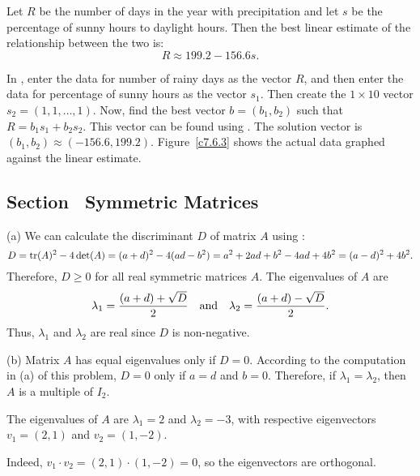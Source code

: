 \begin{figure}[htb]
		\centerline{%
		}
\end{figure}

\ans Let $R$ be the number of days in the year with precipitation and
let $s$ be the percentage of sunny hours to daylight hours.  Then the
best linear estimate of the relationship between the two is:
\[ R \approx 199.2 - 156.6s. \]

\soln In \Matlabp, enter the data for number of rainy days as the vector
$R$, and then enter the data for percentage of sunny hours as the vector
$s_1$.  Then create the $1 \times 10$ vector $s_2 = (1,1,\dots,1)$.  Now,
find the best vector $b = (b_1,b_2)$ such that $R = b_1s_1 + b_2s_2$. 
This vector can be found using .  The solution vector
is $(b_1,b_2) \approx (-156.6,199.2)$.  Figure~\ref{c7.6.3} shows the
actual data graphed against the linear estimate.

\begin{figure}[htb]
		\centerline{%
		}
\end{figure}


\subsection*{Section~\protect{\ref{S:symmetric}} Symmetric Matrices}

(a) We can calculate the discriminant $D$ of matrix $A$ using
:
\[ D = {\rm tr}(A)^2 - 4\det(A) = (a + d)^2 - 4(ad - b^2) =
a^2 + 2ad + b^2 - 4ad + 4b^2 = (a - d)^2 + 4b^2. \]
Therefore, $D \geq 0$ for all real symmetric matrices $A$.  The
eigenvalues of $A$ are
\[ \lambda_1 = \frac{(a + d) + \sqrt{D}}{2} \quad\mbox{and}\quad
\lambda_2 = \frac{(a + d) - \sqrt{D}}{2}. \]
Thus, $\lambda_1$ and $\lambda_2$ are real since $D$ is non-negative.

(b) Matrix $A$ has equal eigenvalues only if $D = 0$.  According to
the computation in (a) of this problem, $D = 0$ only if $a = d$ and
$b = 0$.  Therefore, if $\lambda_1 = \lambda_2$, then $A$ is a
multiple of $I_2$.

\ans The eigenvalues of $A$ are $\lambda_1 = 2$ and $\lambda_2 = -3$,
with respective eigenvectors $v_1 = (2,1)$ and $v_2 = (1,-2)$.

\soln Indeed, $v_1 \cdot v_2 = (2,1) \cdot (1,-2) = 0$, so the
eigenvectors are orthogonal.

